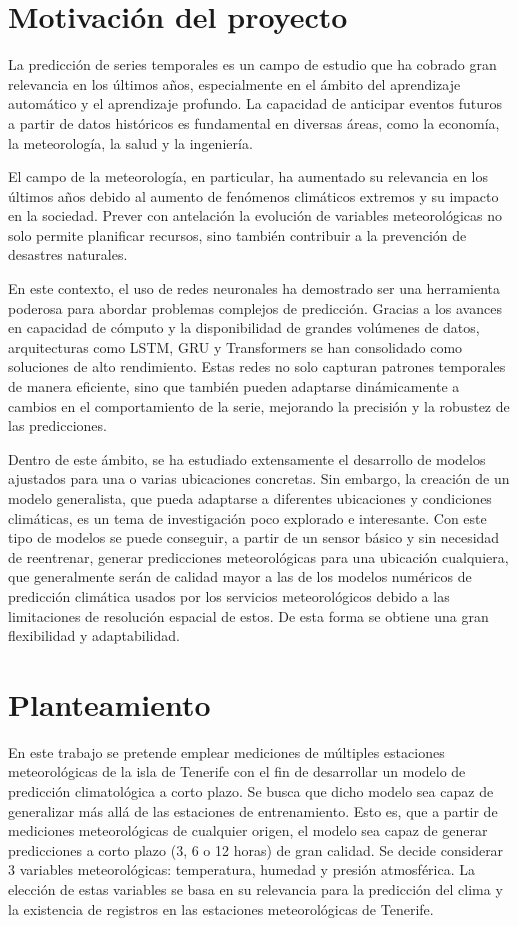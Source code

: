 \section{Motivación del proyecto}
La predicción de series temporales es un campo de estudio que ha cobrado gran relevancia en los últimos años, especialmente en el ámbito del aprendizaje automático y el aprendizaje profundo. 
La capacidad de anticipar eventos futuros a partir de datos históricos es fundamental en diversas áreas, como la economía, la meteorología, la salud y la ingeniería. 

El campo de la meteorología, en particular, ha aumentado su relevancia en los últimos años debido al aumento de fenómenos climáticos extremos y su impacto en la sociedad. 
Prever con antelación la evolución de variables meteorológicas no solo permite planificar recursos, sino también contribuir a la prevención de desastres naturales.

En este contexto, el uso de redes neuronales ha demostrado ser una herramienta poderosa para abordar problemas complejos de predicción.
Gracias a los avances en capacidad de cómputo y la disponibilidad de grandes volúmenes de datos, arquitecturas como LSTM, GRU y Transformers se han consolidado como soluciones de alto rendimiento. 
Estas redes no solo capturan patrones temporales de manera eficiente, sino que también pueden adaptarse dinámicamente a cambios en el comportamiento de la serie, mejorando la precisión y la robustez de las predicciones.

Dentro de este ámbito, se ha estudiado extensamente el desarrollo de modelos ajustados para una o varias ubicaciones concretas. Sin embargo, la creación de un modelo generalista,
que pueda adaptarse a diferentes ubicaciones y condiciones climáticas, es un tema de investigación poco explorado e interesante. Con este tipo de modelos se puede 
conseguir, a partir de un sensor básico y sin necesidad de reentrenar, generar predicciones meteorológicas para una ubicación cualquiera, que generalmente serán de calidad mayor a las de los modelos numéricos de predicción 
climática usados por los servicios meteorológicos debido a las limitaciones de resolución espacial de estos. De esta forma se obtiene una gran flexibilidad y adaptabilidad.

\section{Planteamiento}
En este trabajo se pretende emplear mediciones de múltiples estaciones meteorológicas de la isla de Tenerife con el fin de desarrollar un modelo de predicción climatológica a corto plazo.
Se busca que dicho modelo sea capaz de generalizar más allá de las estaciones de entrenamiento. Esto es, que a partir de mediciones meteorológicas de cualquier origen, el modelo sea capaz de 
generar predicciones a corto plazo (3, 6 o 12 horas) de gran calidad.
Se decide considerar 3 variables meteorológicas: temperatura, humedad y presión atmosférica.
La elección de estas variables se basa en su relevancia para la predicción del clima y la existencia de registros en las estaciones meteorológicas de Tenerife.

